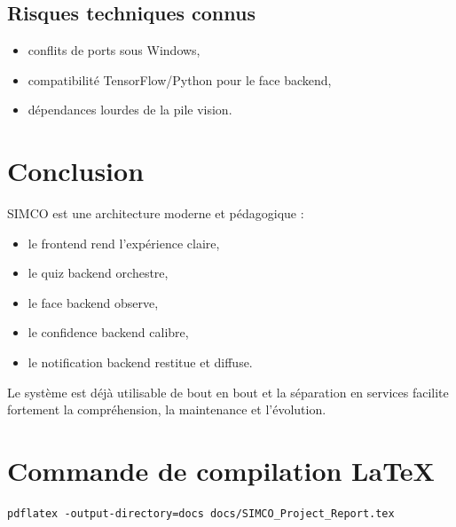 \documentclass[12pt,a4paper]{article}
\begin{document}
\subsection{Risques techniques connus}
\begin{itemize}
    \item conflits de ports sous Windows,
    \item compatibilit\'e TensorFlow/Python pour le face backend,
    \item d\'ependances lourdes de la pile vision.
\end{itemize}

\section{Conclusion}
SIMCO est une architecture moderne et p\'edagogique :
\begin{itemize}
    \item le frontend rend l'exp\'erience claire,
    \item le quiz backend orchestre,
    \item le face backend observe,
    \item le confidence backend calibre,
    \item le notification backend restitue et diffuse.
\end{itemize}

Le syst\`eme est d\'ej\`a utilisable de bout en bout et la s\'eparation en services facilite fortement la compr\'ehension, la maintenance et l'\'evolution.

\appendix
\section{Commande de compilation LaTeX}
\begin{lstlisting}[basicstyle=\ttfamily\small]
pdflatex -output-directory=docs docs/SIMCO_Project_Report.tex
\end{lstlisting}
\end{document}
